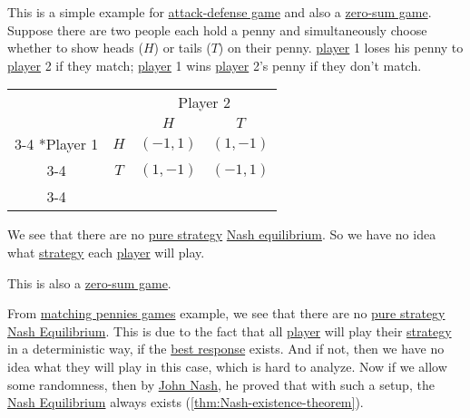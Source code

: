 \begin{eg}\label{eg:matching-pennies}
	This is a simple example for \hyperref[def:attach-defense-game]{attack-defense game} and also a \hyperref[def:zero-sum-game]{zero-sum game}. Suppose there are
	two people each hold a penny and simultaneously choose  whether to show heads (\(H\)) or tails (\(T\)) on their penny. \hyperref[def:player]{player} 1 loses
	his penny to \hyperref[def:player]{player} 2 if they match; \hyperref[def:player]{player} 1 wins \hyperref[def:player]{player} 2's penny if they don't match.
	\begin{table}[H]
		\centering
		\setlength{\extrarowheight}{2pt}
		\begin{tabular}{cc|c|c|}
			                        & \multicolumn{1}{c}{} & \multicolumn{2}{c}{Player 2}                           \\
			                        & \multicolumn{1}{c}{} & \multicolumn{1}{c}{$H$}      & \multicolumn{1}{c}{$T$} \\\cline{3-4}
			\multirow{2}*{Player 1} & $H$                  & $(-1, 1)$                    & $(1, -1)$               \\\cline{3-4}
			                        & $T$                  & $(1, -1)$                    & $(-1, 1)$               \\\cline{3-4}
		\end{tabular}
	\end{table}
	We see that there are no \hyperref[def:pure-strategy]{pure strategy} \hyperref[def:Nash-equilibrium]{Nash equilibrium}. So we have no idea what
	\hyperref[def:strategy]{strategy} each \hyperref[def:player]{player} will play.
	\begin{remark}
		This is also a \hyperref[def:zero-sum-game]{zero-sum game}.
	\end{remark}
\end{eg}

\begin{remark}
	From \hyperref[eg:matching-pennies]{matching pennies games} example, we see that there are no \hyperref[def:pure-strategy]{pure strategy}
	\hyperref[def:Nash-equilibrium]{Nash Equilibrium}. This is due to
	the fact that all \hyperref[def:player]{player} will play their \hyperref[def:strategy]{strategy} in a deterministic way, if the \hyperref[def:best-response]{best response}
	exists. And if not, then we have no idea what they will play in this case, which is hard to analyze.
	Now if we allow some randomness, then by \href{https://en.wikipedia.org/wiki/John_Forbes_Nash_Jr.}{John Nash}, he proved that with such a setup, the
	\hyperref[def:Nash-equilibrium]{Nash Equilibrium} always exists (\autoref{thm:Nash-existence-theorem}).
\end{remark}

